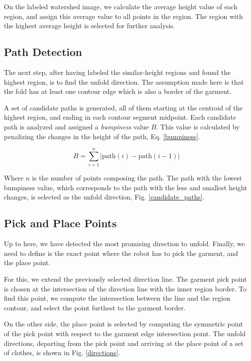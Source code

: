 On the labeled watershed image, we calculate the average height value of each region, and assign this average value to all points in the region. The region with the highest average height is selected for further analysis. 

\subsection{Path Detection}

The next step, after having labeled the similar-height regions and found the highest region, is to find the unfold direction. The assumption made here is that the fold has at least one contour edge which is also a border of the garment. 

A set of candidate paths is generated, all of them starting at the centroid of the highest region, and ending in each contour segment midpoint. Each candidate path is analyzed and assigned a \textit{bumpiness} value $B$. This value is calculated by penalizing the changes in the height of the path, Eq. \eqref{bumpiness}.

\begin{equation}\label{bumpiness}
B = \sum_{i=1}^{n} | \textrm{path}(i)- \textrm{path}(i-1) | 
\end{equation}

Where $n$ is the number of points composing the path. The path with the lowest bumpiness value, which corresponds to the path with the less and smallest height changes, is selected as the unfold direction, Fig. \ref{candidate_paths}.


\subsection{Pick and Place Points}

Up to here, we have detected the most promising direction to unfold. Finally, we need to define is the exact point where the robot has to pick the garment, and the place point. 

For this, we extend the previously selected direction line. The garment pick point is chosen at the intersection of the direction line with the inner region border. To find this point, we compute the intersection between the line and the region contour, and select the point furthest to the garment border.

On the other side, the place point is selected by computing the symmetric point of the pick point with respect to the garment edge intersection point. The unfold directions, departing from the pick point and arriving at the place point of a set of clothes, is shown in Fig. \ref{directions}.
